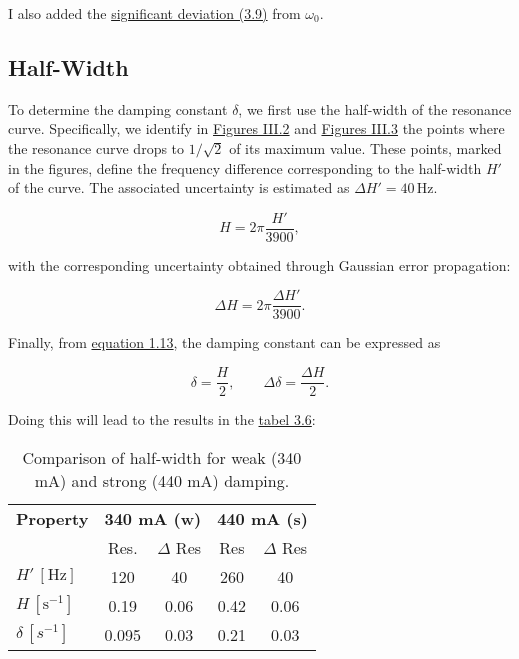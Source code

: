 I also added the \hyperref[eq:signifikante_abweichung]{significant deviation (3.9)} from $\omega_0$.

\subsection*{Half-Width}
To determine the damping constant $\delta$, we first use the half-width of the resonance curve. Specifically, we identify in \hyperref[fig:curve_strong]{Figures III.2} and \hyperref[fig:curve_weak]{Figures III.3} the points where the resonance curve drops to $1/\sqrt{2}$ of its maximum value. These points, marked in the figures, define the frequency difference corresponding to the half-width $H'$ of the curve. The associated uncertainty is estimated as $\Delta H' = 40\,\text{Hz}$.  

\begin{equation}
    H = 2\pi \frac{H'}{3900},
\end{equation}

with the corresponding uncertainty obtained through Gaussian error propagation:  

\begin{equation}
    \Delta H = 2\pi \frac{\Delta H'}{3900}.
\end{equation}

Finally, from \hyperref[eq:h_delta]{equation 1.13}, the damping constant can be expressed as  

\begin{equation}
    \delta = \frac{H}{2}, \qquad \Delta \delta = \frac{\Delta H}{2}.
\end{equation}


Doing this will lead to the results in the \hyperref[tab:res_halfw]{tabel 3.6}:
\begin{table}[t!]
    \centering
    \begin{tabular}{l | c c | c c}
        \toprule
        \textbf{Property} & \multicolumn{2}{c|}{\textbf{340 mA (w)}} & \multicolumn{2}{c}{\textbf{440 mA (s)}} \\
        & Res. & $\Delta$ Res & Res & $\Delta$ Res \\
        \hline
        $H' \,[\text{Hz}]$ & 120 & 40 & 260 & 40 \\
        $H \,[\text{s}^{-1}]$ & 0.19 & 0.06 & 0.42 & 0.06 \\
        $\delta \, [s^{-1}]$ & 0.095 & 0.03 & 0.21 & 0.03 \\
        \bottomrule
    \end{tabular}
    \caption{Comparison of half-width for weak (340 mA) and strong (440 mA) damping.}
    \label{tab:res_halfw}
\end{table}

